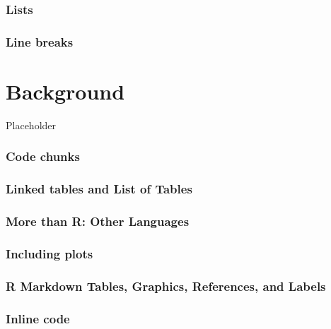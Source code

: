 \documentclass[12pt,oneside]{chicagocapstone}
\begin{document}
\subsection*{Lists}\label{lists}

\subsection*{Line breaks}\label{line-breaks}

\chapter*{Background}\label{background}

Placeholder

\subsection*{Code chunks}\label{code-chunks}

\subsection*{Linked tables and List of
Tables}\label{linked-tables-and-list-of-tables}

\subsection*{More than R: Other
Languages}\label{more-than-r-other-languages}

\subsection*{Including plots}\label{pressure-plot}

\subsection*{R Markdown Tables, Graphics, References, and
Labels}\label{ref-labels}

\subsection*{Inline code}\label{inline-code}
\end{document}
